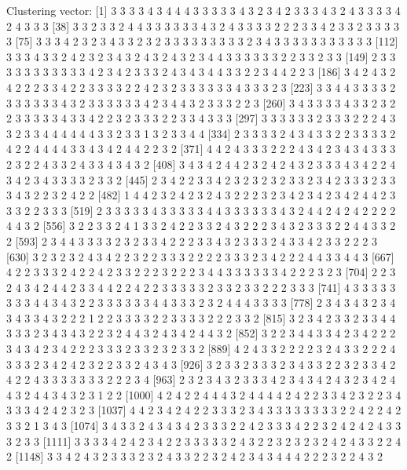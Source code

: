 \begin{Schunk}
\begin{Soutput}
Clustering vector:
   [1] 3 3 3 3 4 3 4 4 4 3 3 3 3 3 4 3 2 3 4 2 3 3 3 4 3 2 4 3 3 3 3 4 2 4 3 3 3
  [38] 3 3 2 3 3 2 4 4 3 3 3 3 3 3 4 3 2 4 3 3 3 3 2 2 2 3 3 4 2 3 3 2 3 3 3 3 3
  [75] 3 3 3 4 2 3 2 3 4 3 3 2 3 2 3 3 3 3 3 3 3 3 3 2 3 4 3 3 3 3 3 3 3 3 3 3 3
 [112] 3 3 3 4 3 3 2 4 2 3 2 3 4 3 2 4 3 2 4 3 2 3 4 4 3 3 3 3 3 3 2 2 3 3 2 3 3
 [149] 2 3 3 3 3 3 3 3 3 3 3 3 4 2 3 4 2 3 3 3 2 4 3 4 3 4 4 3 3 2 2 3 4 4 2 2 3
 [186] 3 4 2 4 3 2 4 2 2 2 3 3 4 2 2 3 3 3 3 2 2 4 2 3 2 3 3 3 3 3 3 4 3 3 3 2 3
 [223] 3 3 4 4 3 3 3 3 2 3 3 3 3 3 3 4 3 2 3 3 3 3 3 3 4 2 3 4 4 3 2 3 3 3 2 2 3
 [260] 3 4 3 3 3 3 4 3 3 2 3 2 2 3 3 3 3 3 4 3 3 4 2 2 3 2 3 3 3 2 2 3 3 4 3 3 3
 [297] 3 3 3 3 3 3 2 3 3 3 2 2 2 4 3 3 2 3 3 4 4 4 4 4 4 3 3 2 3 3 1 3 2 3 3 4 4
 [334] 2 3 3 3 3 2 4 3 4 3 3 2 2 3 3 3 3 2 4 2 2 4 4 4 4 3 3 4 3 4 2 4 4 2 2 3 2
 [371] 4 4 2 4 3 3 3 2 2 2 4 3 4 2 3 4 3 4 3 3 3 2 3 2 2 4 3 3 2 4 3 3 4 3 4 3 2
 [408] 3 4 3 4 2 4 4 2 3 2 4 2 4 3 2 3 3 3 4 3 4 2 2 4 3 4 2 3 4 3 3 3 3 2 3 3 2
 [445] 2 3 4 2 2 3 3 4 2 3 2 3 2 3 2 3 3 2 3 4 2 3 3 3 2 3 3 3 4 3 2 2 3 2 4 2 2
 [482] 1 4 4 2 3 2 4 2 3 2 4 3 2 2 2 3 2 3 4 2 3 4 2 3 4 2 4 4 2 3 3 3 2 2 3 3 3
 [519] 2 3 3 3 3 3 4 3 3 3 3 3 4 4 3 3 3 3 3 3 4 3 2 4 4 2 4 2 4 2 2 2 2 4 4 3 2
 [556] 3 2 2 3 3 2 4 1 3 3 2 4 2 2 3 3 2 4 3 2 2 2 3 4 3 2 3 3 3 2 2 4 4 3 3 2 2
 [593] 2 3 4 4 3 3 3 3 2 3 2 3 3 4 2 2 2 3 3 4 3 2 3 3 3 2 4 3 3 4 2 3 3 2 2 2 3
 [630] 3 2 3 2 3 2 4 3 4 2 2 3 2 2 3 3 3 2 2 2 2 3 3 3 2 3 4 2 2 2 4 4 3 3 4 4 3
 [667] 4 2 2 3 3 3 2 4 2 2 4 2 3 3 2 2 2 3 2 2 2 3 4 4 3 3 3 3 3 3 4 2 2 2 3 2 3
 [704] 2 2 3 2 4 3 4 2 4 4 2 3 3 4 4 2 2 4 2 2 3 3 3 3 3 2 3 3 2 3 3 2 2 2 3 3 3
 [741] 4 3 3 3 3 3 3 3 3 4 4 3 4 3 2 2 3 3 3 3 3 3 4 4 3 3 3 2 3 2 4 4 4 3 3 3 3
 [778] 2 3 4 3 4 3 2 3 4 3 4 3 3 4 3 2 2 2 1 2 2 3 3 3 3 2 2 3 3 3 3 2 2 2 3 3 2
 [815] 3 2 3 4 2 3 3 2 3 3 4 4 3 3 3 2 3 4 3 4 3 2 2 3 2 4 4 3 2 4 3 4 2 4 4 3 2
 [852] 3 2 2 3 4 4 3 3 4 2 3 4 2 2 2 3 4 3 4 2 3 4 2 2 2 3 3 3 2 3 3 2 3 2 3 3 2
 [889] 4 2 4 3 3 2 2 2 2 3 2 4 3 3 2 2 2 4 3 3 3 2 3 4 2 4 2 3 2 2 3 3 2 4 3 4 3
 [926] 3 2 3 3 2 3 3 3 2 3 4 3 3 2 2 3 2 3 3 4 2 4 2 2 4 3 3 3 3 3 3 3 2 2 2 3 4
 [963] 2 3 2 3 4 3 2 3 3 3 4 2 3 4 3 4 2 4 3 2 3 4 2 4 4 3 2 4 4 3 4 3 2 3 1 2 2
[1000] 4 2 4 2 2 4 4 4 3 2 4 4 4 4 2 4 2 2 3 3 4 2 3 2 2 3 4 3 3 3 4 2 4 2 3 2 3
[1037] 4 4 2 3 4 2 4 2 2 3 3 3 2 3 4 3 3 3 3 3 3 3 3 2 2 4 2 2 4 2 3 3 2 1 3 4 3
[1074] 3 4 3 3 2 4 3 4 3 4 2 3 3 3 2 2 4 2 3 3 3 4 2 2 3 2 4 2 4 2 4 3 3 3 2 3 3
[1111] 3 3 3 3 4 2 4 2 3 4 2 2 3 3 3 3 3 2 4 3 2 2 3 2 3 2 3 2 4 2 4 3 3 2 2 4 2
[1148] 3 3 4 2 4 3 2 3 3 3 2 3 2 4 3 3 2 2 3 2 4 2 3 4 3 4 4 4 2 2 2 3 2 2 4 3 2

\end{Soutput}
\end{Schunk}
